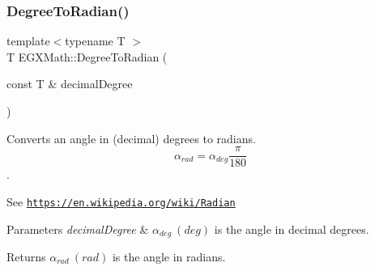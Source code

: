 \subsubsection{\texorpdfstring{Degree\+To\+Radian()}{DegreeToRadian()}}
{\footnotesize\ttfamily template$<$typename T $>$ \\
T E\+G\+X\+Math\+::\+Degree\+To\+Radian (\begin{DoxyParamCaption}\item[{const T \&}]{decimal\+Degree }\end{DoxyParamCaption})}



Converts an angle in (decimal) degrees to radians. \[\alpha_{rad}=\alpha_{deg}\frac{\pi}{180}\]. 

See \href{https://en.wikipedia.org/wiki/Radian}{\tt https\+://en.\+wikipedia.\+org/wiki/\+Radian} 
\begin{DoxyParams}{Parameters}
{\em decimal\+Degree} & $\alpha_{deg}\ (deg)$ is the angle in decimal degrees. \\
\hline
\end{DoxyParams}
\begin{DoxyReturn}{Returns}
$\alpha_{rad}\ (rad)$ is the angle in radians. 
\end{DoxyReturn}
